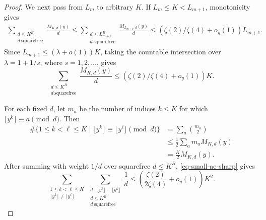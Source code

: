 \documentclass[11pt,reqno]{amsart}
\numberwithin{equation}{section}
\begin{document}
\begin{proof}
        We next pass from $L_m$ to arbitrary $K$. If $L_m\le K<L_{m+1}$, monotonicity gives
        $$
        \begin{aligned}
            \sum_{\substack{d\le K^B\\ d\ \mathrm{squarefree}}}\frac{M_{K,d}(y)}d
            \le \sum_{\substack{d\le L_{m+1}^B\\ d\ \mathrm{squarefree}}}\frac{M_{L_{m+1},d}(y)}d
            \le (\zeta(2)/\zeta(4)+o_y(1))L_{m+1}.
        \end{aligned}
        $$
        Since $L_{m+1}\le(\lambda+o(1))K$, taking the countable intersection over $\lambda=1+1/s$, where $s=1,2,\ldots$, gives
        \begin{equation}\label{eq-small-ae-sharp}
            \sum_{\substack{d\le K^B\\ d\ \mathrm{squarefree}}}\frac{M_{K,d}(y)}d
            \le (\zeta(2)/\zeta(4)+o_y(1))K.
        \end{equation}

        For each fixed $d$, let $m_a$ be the number of indices $k\le K$ for which $\lfloor y^k\rfloor\equiv a\pmod d$. Then
        \begin{align*}
            \#\{1\le k<\ell\le K\mid \lfloor y^k\rfloor\equiv\lfloor y^\ell\rfloor\pmod d\}
            &=\sum_a\binom{m_a}{2}\\
            &\le \frac12\sum_a m_aM_{K,d}(y)\\
            &=\frac K2M_{K,d}(y).
        \end{align*}
        After summing with weight $1/d$ over squarefree $d\le K^B$, \eqref{eq-small-ae-sharp} gives
        \begin{equation}\label{eq-small-pair-sharp}
            \sum_{\substack{1\le k<\ell\le K\\ \lfloor y^k\rfloor\ne\lfloor y^\ell\rfloor}}
            \sum_{\substack{d\mid \lfloor y^\ell\rfloor-\lfloor y^k\rfloor\\d\le K^B\\ d\ \mathrm{squarefree}}}\frac1d
            \le \left(\frac{\zeta(2)}{2\zeta(4)}+o_y(1)\right)K^2.
        \end{equation}


\end{proof}
\end{document}
